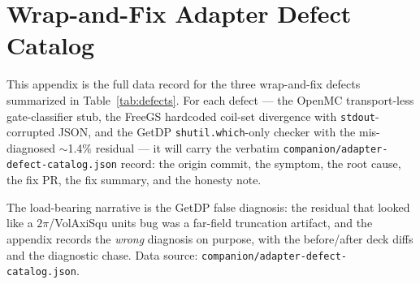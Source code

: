 \section{Wrap-and-Fix Adapter Defect Catalog}
\label{app:adapters}

This appendix is the full data record for the three wrap-and-fix
defects summarized in Table~\ref{tab:defects}. For each defect ---
the OpenMC transport-less gate-classifier stub, the FreeGS hardcoded
coil-set divergence with \texttt{stdout}-corrupted JSON, and the
GetDP \texttt{shutil.which}-only checker with the mis-diagnosed
$\sim$1.4\% residual --- it will carry the verbatim
\texttt{companion/\allowbreak adapter-defect-catalog.json} record: the
origin
commit, the symptom, the root cause, the fix PR, the fix summary, and
the honesty note.

The load-bearing narrative is the GetDP false diagnosis: the residual
that looked like a $2\pi$/VolAxiSqu units bug was a far-field
truncation artifact, and the appendix records the \emph{wrong}
diagnosis on purpose, with the before/after deck diffs and the
diagnostic chase. Data source:
\texttt{companion/adapter-defect-catalog.json}.

